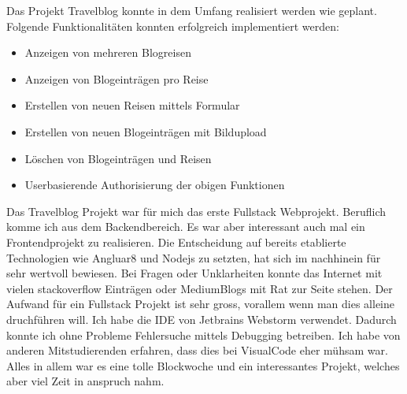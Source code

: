 \documentclass[../main.tex]{subfiles}
\begin{document}
Das Projekt Travelblog konnte in dem Umfang realisiert werden wie geplant. Folgende Funktionalitäten konnten erfolgreich implementiert werden:
\begin{itemize}
    \item Anzeigen von mehreren Blogreisen
    \item Anzeigen von Blogeinträgen pro Reise
    \item Erstellen von neuen Reisen mittels Formular
    \item Erstellen von neuen Blogeinträgen mit Bildupload
    \item Löschen von Blogeinträgen und Reisen
    \item Userbasierende Authorisierung der obigen Funktionen
\end{itemize}

Das Travelblog Projekt war für mich das erste Fullstack Webprojekt. Beruflich komme ich aus dem Backendbereich. Es war aber interessant auch mal ein Frontendprojekt zu realisieren. Die Entscheidung auf bereits etablierte Technologien wie Angluar8 und Nodejs zu setzten, hat sich im nachhinein für sehr wertvoll bewiesen. Bei Fragen oder Unklarheiten konnte das Internet mit vielen stackoverflow Einträgen oder MediumBlogs mit Rat zur Seite stehen. Der Aufwand für ein Fullstack Projekt ist sehr gross, vorallem wenn man dies alleine druchführen will. Ich habe die IDE von Jetbrains Webstorm verwendet. Dadurch konnte ich ohne Probleme Fehlersuche mittels Debugging betreiben. Ich habe von anderen Mitstudierenden erfahren, dass dies bei VisualCode eher mühsam war. Alles in allem war es eine tolle Blockwoche und ein interessantes Projekt, welches aber viel Zeit in anspruch nahm.
\end{document}
